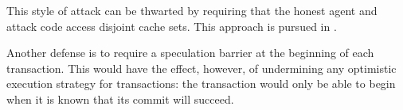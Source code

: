 This style of attack can be thwarted by requiring that the honest agent and
attack code access disjoint cache sets.  This approach is pursued in \cite{dawg}.

Another defense is to require a speculation barrier at the beginning of each
transaction.  This would have the effect, however, of undermining any
optimistic execution strategy for transactions: the transaction would only be
able to begin when it is known that its commit will succeed.



